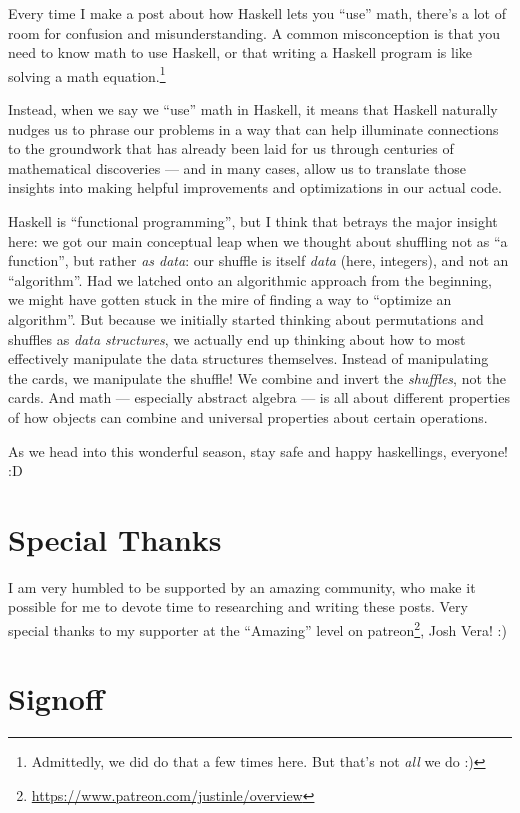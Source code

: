 \documentclass[]{article}
\renewcommand{\href}[2]{#2\footnote{\url{#1}}}
\begin{document}
Every time I make a post about how Haskell lets you ``use'' math, there's a lot
of room for confusion and misunderstanding. A common misconception is that you
need to know math to use Haskell, or that writing a Haskell program is like
solving a math equation.\footnote{Admittedly, we did do that a few times here.
  But that's not \emph{all} we do :)}

Instead, when we say we ``use'' math in Haskell, it means that Haskell naturally
nudges us to phrase our problems in a way that can help illuminate connections
to the groundwork that has already been laid for us through centuries of
mathematical discoveries --- and in many cases, allow us to translate those
insights into making helpful improvements and optimizations in our actual code.

Haskell is ``functional programming'', but I think that betrays the major
insight here: we got our main conceptual leap when we thought about shuffling
not as ``a function'', but rather \emph{as data}: our shuffle is itself
\emph{data} (here, integers), and not an ``algorithm''. Had we latched onto an
algorithmic approach from the beginning, we might have gotten stuck in the mire
of finding a way to ``optimize an algorithm''. But because we initially started
thinking about permutations and shuffles as \emph{data structures}, we actually
end up thinking about how to most effectively manipulate the data structures
themselves. Instead of manipulating the cards, we manipulate the shuffle! We
combine and invert the \emph{shuffles}, not the cards. And math --- especially
abstract algebra --- is all about different properties of how objects can
combine and universal properties about certain operations.

As we head into this wonderful season, stay safe and happy haskellings,
everyone! :D

\hypertarget{special-thanks}{%
\section{Special Thanks}\label{special-thanks}}

I am very humbled to be supported by an amazing community, who make it possible
for me to devote time to researching and writing these posts. Very special
thanks to my supporter at the ``Amazing'' level on
\href{https://www.patreon.com/justinle/overview}{patreon}, Josh Vera! :)

\hypertarget{signoff}{%
\section{Signoff}\label{signoff}}
\end{document}
